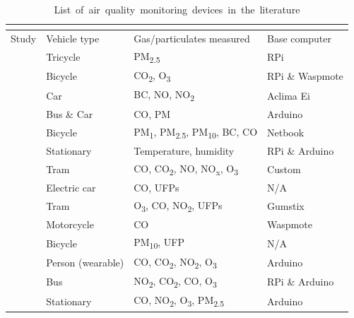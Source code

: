 \documentclass[11pt]{report}
\begin{document}
\begin{landscape}
  \footnotesize
\begin{longtable}{ p{} p{} p{} p{} }
  \caption{\mbox{List of air quality monitoring devices in the literature}}
  \vspace{-0.4cm}
  \label{listofprevdevices} \\
  \toprule
  Study & Vehicle type & Gas/particulates measured & Base computer \\ \midrule
  \cite{Jabbar2017bikefossarchitecture} & Tricycle & PM\textsubscript{2.5} & RPi \\ \midrule
  \cite{Alvear2016ecosensor} & Bicycle & CO\textsubscript{2}, O\textsubscript{3} & RPi \& Waspmote\\ \midrule
  \cite{Apte2017googlestreetview} & Car & BC, NO, NO\textsubscript{2} & Aclima Ei \\ \midrule
  \cite{Devarakonda2013} & Bus \& Car & CO, PM & Arduino \\ \midrule
  \cite{Elen2013aeroflex} & Bicycle & PM\textsubscript{1}, PM\textsubscript{2.5}, PM\textsubscript{10}, BC, CO & Netbook \\ \midrule
  \cite{Ferdoush2014rasppiandarduino} & Stationary & Temperature, humidity & RPi \& Arduino \\ \midrule
  \cite{Hagemann2014aerotram} & Tram & CO, CO\textsubscript{2}, NO, NO\textsubscript{x}, O\textsubscript{3}  & Custom \\ \midrule
  \cite{Hagler2010durhamallelectric} & Electric car & CO, UFPs & N/A \\ \midrule
  \cite{Hasenfratz2015highresmapsTram} & Tram & O\textsubscript{3}, CO, NO\textsubscript{2}, UFPs & Gumstix \\ \midrule
  \cite{Hoang2013hanoihexagons} & Motorcycle & CO & Waspmote \\ \midrule
  \cite{Peters2013cycleruns} & Bicycle & PM\textsubscript{10}, UFP & N/A \\ \midrule
  \cite{Piedrahita2014quantexposuremtrng} & Person (wearable) & CO, CO\textsubscript{2}, NO\textsubscript{2}, O\textsubscript{3} & Arduino \\ \midrule
  \cite{2014busairqualityVSN} & Bus & NO\textsubscript{2}, CO\textsubscript{2}, CO, O\textsubscript{3} & RPi \& Arduino \\ \midrule
  \cite{sun2016HKmarathonML} & Stationary & CO, NO\textsubscript{2}, O\textsubscript{3}, PM\textsubscript{2.5} & Arduino \\ \midrule

\end{longtable}
\end{landscape}
\end{document}
